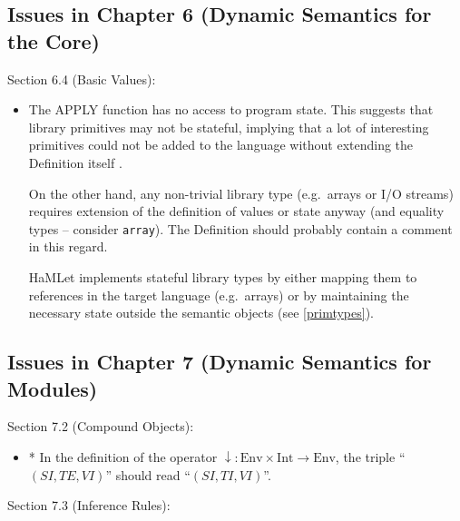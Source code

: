 \documentclass[twoside,titlepage]{article}
\begin{document}
\begin{appendix}
\subsection{Issues in Chapter 6 (Dynamic Semantics for the Core)}
\label{bugschapter6}

Section 6.4 (Basic Values):

\begin{itemize}
\item The APPLY function has no access to program state. This suggests that library primitives may not be stateful, implying that a lot of interesting primitives could not be added to the language without extending the Definition itself \cite{mistakes}.

On the other hand, any non-trivial library type (e.g.\ arrays or I/O streams) requires extension of the definition of values or state anyway (and equality types -- consider {\tt array}). The Definition should probably contain a comment in this regard.

HaMLet implements stateful library types by either mapping them to references in the target language (e.g.\ arrays) or by maintaining the necessary state outside the semantic objects (see \ref{primtypes}).
\end{itemize}


\subsection{Issues in Chapter 7 (Dynamic Semantics for Modules)}
\label{bugschapter7}

Section 7.2 (Compound Objects):

\begin{itemize}

\item * In the definition of the operator ${\downarrow}:\mbox{Env}\times\mbox{Int}\to\mbox{Env}$, the triple ``$(\mathit{SI},\mathit{TE},\mathit{VI})$'' should read ``$(\mathit{SI},\mathit{TI},\mathit{VI})$''.

\end{itemize}


Section 7.3 (Inference Rules):

\begin{itemize}


\end{itemize}
\end{appendix}
\end{document}
